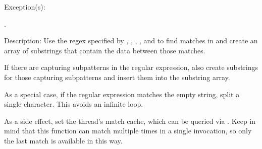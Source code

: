 \begin{capi}
\begin{capilist}
\begin{description}
		\end{description}
	\item[Exception(s): ]
		\begin{description}\item[]
		\item[.]
		\end{description}
	\item[Description: ]
		Use the regex specified by , ,
		, , and
		 to find matches in  and
		create an array of substrings that contain the data between
		those matches.

		If there are capturing subpatterns in the regular expression,
		also create substrings for those capturing subpatterns and
		insert them into the substring array.

		As a special case, if the regular expression matches the empty
		string, split a single character.  This avoids an infinite
		loop.

		As a side effect, set the thread's match cache, which can be
		queried via .  Keep in mind that
		this function can match multiple times in a single invocation,
		so only the last match is available in this way.


\end{capilist}
\end{capi}
